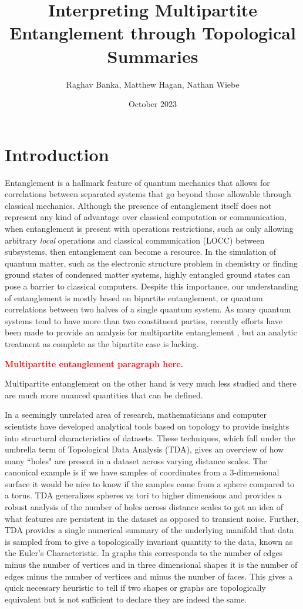 \documentclass{article}
\title{Interpreting Multipartite Entanglement through Topological Summaries}
\author{Raghav Banka, Matthew Hagan, Nathan Wiebe}
\date{October 2023}
\begin{document}
\maketitle

\section{Introduction}
Entanglement is a hallmark feature of quantum mechanics that allows for correlations between separated systems that go beyond those allowable through classical mechanics. Although the presence of entanglement itself does not represent any kind of advantage over classical computation or communication, when entanglement is present with operations restrictions, such as only allowing arbitrary \emph{local} operations and classical communication (LOCC) between subsystems, then entanglement can become a resource. In the simulation of quantum matter, such as the electronic structure problem in chemistry or finding ground states of condensed matter systems, highly entangled ground states can pose a barrier to classical computers. Despite this importance, our understanding of entanglement is mostly based on bipartite entanglement, or quantum correlations between two halves of a single quantum system. As many quantum systems tend to have more than two constituent parties, recently efforts have been made to provide an analysis for multipartite entanglement \cite{horodecki2024multipartiteentanglement}, but an analytic treatment as complete as the bipartite case is lacking. 

\textcolor{red}{\textbf{Multipartite entanglement paragraph here.}}


Multipartite entanglement on the other hand is very much less studied and there are much more nuanced quantities that can be defined.

In a seemingly unrelated area of research, mathematicians and computer scientists have developed analytical tools based on topology to provide insights into structural characteristics of datasets. These techniques, which fall under the umbrella term of Topological Data Analysis (TDA), gives an overview of how many ``holes" are present in a dataset across varying distance scales. The canonical example is if we have samples of coordinates from a 3-dimensional surface it would be nice to know if the samples come from a sphere compared to a torus. TDA generalizes spheres vs tori to higher dimensions and provides a robust analysis of the number of holes across distance scales to get an idea of what features are persistent in the dataset as opposed to transient noise. Further, TDA provides a single numerical summary of the underlying manifold that data is sampled from to give a topologically invariant quantity to the data, known as the Euler's Characteristic. In graphs this corresponds to the number of edges minus the number of vertices and in three dimensional shapes it is the number of edges minus the number of vertices and minus the number of faces. This gives a quick necessary heuristic to tell if two shapes or graphs are topologically equivalent but is not sufficient to declare they are indeed the same. 
\end{document}
